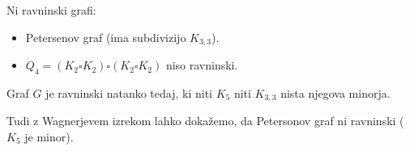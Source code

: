 \begin{primer}
    Ni ravninski grafi:
    \begin{itemize}
        \item Petersenov graf (ima subdivizijo $K_{3,3}$).
        \item $Q_4 = (K_2 \square K_2) \square (K_2 \square K_2)$ niso ravninski.
    \end{itemize}
\end{primer}

\begin{izrek}[Wagner]
    Graf $G$ je ravninski natanko tedaj, ki niti $K_5$ niti $K_{3,3}$ nista njegova minorja.
\end{izrek}

\begin{primer}
    Tudi z Wagnerjevem izrekom lahko dokažemo, da Petersonov graf ni ravninski ($K_5$ je minor). 
\end{primer}